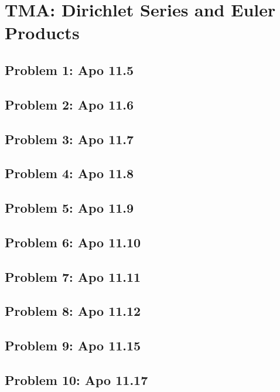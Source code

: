\section{TMA: Dirichlet Series and Euler Products}

\subsection[Problem 1]{Problem 1: Apo 11.5}

\subsection[Problem 2]{Problem 2: Apo 11.6}

\subsection[Problem 3]{Problem 3: Apo 11.7}

\subsection[Problem 4]{Problem 4: Apo 11.8}

\subsection[Problem 5]{Problem 5: Apo 11.9}

\subsection[Problem 6]{Problem 6: Apo 11.10}

\subsection[Problem 7]{Problem 7: Apo 11.11}

\subsection[Problem 8]{Problem 8: Apo 11.12}

\subsection[Problem 9]{Problem 9: Apo 11.15}

\subsection[Problem 10]{Problem 10: Apo 11.17}